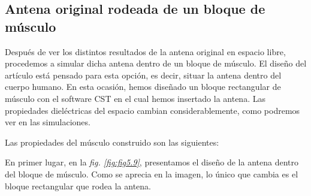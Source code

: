\clearpage

\subsection{Antena original rodeada de un bloque de músculo}\label{subsec:antena-original-rodeada-de-un-bloque-de-musculo}

Después de ver los distintos resultados de la antena original en espacio libre, procedemos a simular dicha antena dentro de un bloque de músculo. El diseño del artículo está pensado para esta opción, es decir, situar la antena dentro del cuerpo humano. En esta ocasión, hemos diseñado un bloque rectangular de músculo con el software CST en el cual hemos insertado la antena. Las propiedades dieléctricas del espacio cambian considerablemente, como podremos ver en las simulaciones.

Las propiedades del músculo construido son las siguientes:


\begin{table}[h]
    \centering{}
    \caption{Propiedades del bloque de músculo diseñado para su simulación.}
    \label{tab:tabla5.3}
\end{table}

En primer lugar, en la \textit{fig. \ref{fig:fig5.9}}, presentamos el diseño de la antena dentro del bloque de músculo. Como se aprecia en la imagen, lo único que cambia es el bloque rectangular que rodea la antena.

